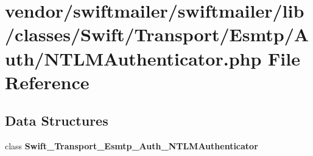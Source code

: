\section{vendor/swiftmailer/swiftmailer/lib/classes/\+Swift/\+Transport/\+Esmtp/\+Auth/\+N\+T\+L\+M\+Authenticator.php File Reference}
\label{_n_t_l_m_authenticator_8php}
\subsection*{Data Structures}
\begin{DoxyCompactItemize}
\item 
class {\bf Swift\+\_\+\+Transport\+\_\+\+Esmtp\+\_\+\+Auth\+\_\+\+N\+T\+L\+M\+Authenticator}
\end{DoxyCompactItemize}
